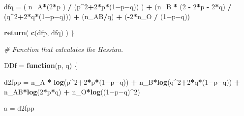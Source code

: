 \documentclass[]{article}
\newenvironment{Shaded}{\begin{snugshade}}{\end{snugshade}}
\newcommand{\KeywordTok}[1]{\textcolor[rgb]{0.13,0.29,0.53}{\textbf{#1}}}
\newcommand{\DecValTok}[1]{\textcolor[rgb]{0.00,0.00,0.81}{#1}}
\newcommand{\StringTok}[1]{\textcolor[rgb]{0.31,0.60,0.02}{#1}}
\newcommand{\CommentTok}[1]{\textcolor[rgb]{0.56,0.35,0.01}{\textit{#1}}}
\newcommand{\ControlFlowTok}[1]{\textcolor[rgb]{0.13,0.29,0.53}{\textbf{#1}}}
\newcommand{\OperatorTok}[1]{\textcolor[rgb]{0.81,0.36,0.00}{\textbf{#1}}}
\newcommand{\NormalTok}[1]{#1}
\begin{document}
\begin{Shaded}
\begin{Highlighting}[]
\NormalTok{  dfq =}\StringTok{   }\NormalTok{( n_A}\OperatorTok{*}\NormalTok{(}\DecValTok{2}\OperatorTok{*}\NormalTok{p ) }\OperatorTok{/}\StringTok{ }\NormalTok{(p}\OperatorTok{^}\DecValTok{2}\OperatorTok{+}\DecValTok{2}\OperatorTok{*}\NormalTok{p}\OperatorTok{*}\NormalTok{(}\DecValTok{1}\NormalTok{−p−q)) )   }
        \OperatorTok{+}\StringTok{ }\NormalTok{(n_B }\OperatorTok{*}\StringTok{ }\NormalTok{(}\DecValTok{2} \OperatorTok{-}\StringTok{ }\DecValTok{2}\OperatorTok{*}\NormalTok{p }\OperatorTok{-}\StringTok{ }\DecValTok{2}\OperatorTok{*}\NormalTok{q) }\OperatorTok{/}\StringTok{ }\NormalTok{(q}\OperatorTok{^}\DecValTok{2}\OperatorTok{+}\DecValTok{2}\OperatorTok{*}\NormalTok{q}\OperatorTok{*}\NormalTok{(}\DecValTok{1}\NormalTok{−p−q))) }
        \OperatorTok{+}\StringTok{ }\NormalTok{(n_AB}\OperatorTok{/}\NormalTok{q) }
        \OperatorTok{+}\StringTok{ }\NormalTok{(}\OperatorTok{-}\DecValTok{2}\OperatorTok{*}\NormalTok{n_O }\OperatorTok{/}\StringTok{ }\NormalTok{(}\DecValTok{1}\NormalTok{−p−q))}
  
  \KeywordTok{return}\NormalTok{( }\KeywordTok{c}\NormalTok{(dfp, dfq) )}
\NormalTok{\}}



\CommentTok{# Function that calculates the Hessian.}

\NormalTok{DDf =}\StringTok{ }\ControlFlowTok{function}\NormalTok{(p, q) \{}
  
\NormalTok{    d2fpp =}\StringTok{ }\NormalTok{n_A }\OperatorTok{*}\StringTok{ }\KeywordTok{log}\NormalTok{(p}\OperatorTok{^}\DecValTok{2}\OperatorTok{+}\DecValTok{2}\OperatorTok{*}\NormalTok{p}\OperatorTok{*}\NormalTok{(}\DecValTok{1}\NormalTok{−p−q)) }\OperatorTok{+}\StringTok{ }\NormalTok{n_B}\OperatorTok{*}\KeywordTok{log}\NormalTok{(q}\OperatorTok{^}\DecValTok{2}\OperatorTok{+}\DecValTok{2}\OperatorTok{*}\NormalTok{q}\OperatorTok{*}\NormalTok{(}\DecValTok{1}\NormalTok{−p−q)) }\OperatorTok{+}\StringTok{ }\NormalTok{n_AB}\OperatorTok{*}\KeywordTok{log}\NormalTok{(}\DecValTok{2}\OperatorTok{*}\NormalTok{p}\OperatorTok{*}\NormalTok{q) }\OperatorTok{+}\StringTok{ }\NormalTok{n_O}\OperatorTok{*}\KeywordTok{log}\NormalTok{((}\DecValTok{1}\NormalTok{−p−q)}\OperatorTok{^}\DecValTok{2}\NormalTok{) }
    
    
    
    
\NormalTok{    a =}\StringTok{ }\NormalTok{d2fpp}
    
    
    
    
    

\end{Highlighting}
\end{Shaded}
\end{document}
